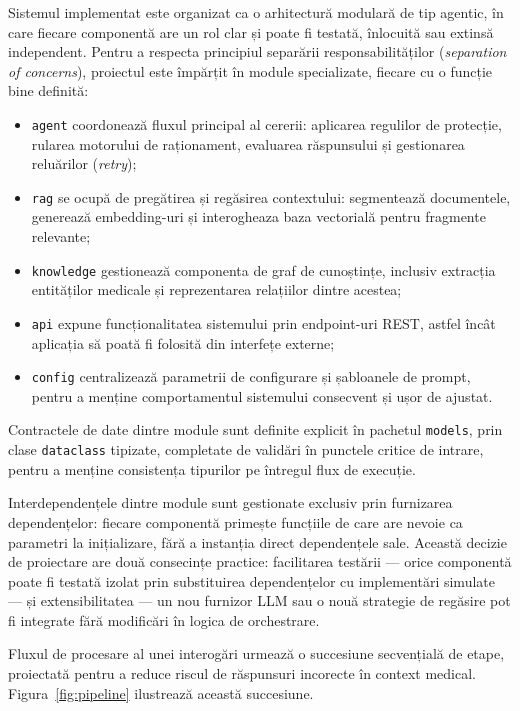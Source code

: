 \documentclass[12pt, a4paper, oneside, romanian]{teza-upb}
\begin{document}
Sistemul implementat este organizat ca o arhitectură modulară de tip agentic, în care fiecare componentă are un rol clar și poate fi testată, înlocuită sau extinsă independent. Pentru a respecta principiul separării responsabilităților (\textit{separation of concerns}), proiectul este împărțit în module specializate, fiecare cu o funcție bine definită:
\begin{itemize}
    \item \texttt{agent} coordonează fluxul principal al cererii: aplicarea regulilor de protecție, rularea motorului de raționament, evaluarea răspunsului și gestionarea reluărilor (\textit{retry});
    \item \texttt{rag} se ocupă de pregătirea și regăsirea contextului: segmentează documentele, generează embedding-uri și interogheaza baza vectorială pentru fragmente relevante;
    \item \texttt{knowledge} gestionează componenta de graf de cunoștințe, inclusiv extracția entităților medicale și reprezentarea relațiilor dintre acestea;
    \item \texttt{api} expune funcționalitatea sistemului prin endpoint-uri REST, astfel încât aplicația să poată fi folosită din interfețe externe;
    \item \texttt{config} centralizează parametrii de configurare și șabloanele de prompt, pentru a menține comportamentul sistemului consecvent și ușor de ajustat.
\end{itemize}
Contractele de date dintre module sunt definite explicit în pachetul \texttt{models}, prin clase \texttt{dataclass} tipizate, completate de validări în punctele critice de intrare, pentru a menține consistența tipurilor pe întregul flux de execuție.

Interdependențele dintre module sunt gestionate exclusiv prin furnizarea dependențelor: fiecare componentă primește funcțiile de care are nevoie ca parametri la inițializare, fără a instanția direct dependențele sale. Această decizie de proiectare are două consecințe practice: facilitarea testării — orice componentă poate fi testată izolat prin substituirea dependențelor cu implementări simulate — și extensibilitatea — un nou furnizor LLM sau o nouă strategie de regăsire pot fi integrate fără modificări în logica de orchestrare.

Fluxul de procesare al unei interogări urmează o succesiune secvențială de etape, proiectată pentru a reduce riscul de răspunsuri incorecte în context medical. Figura~\ref{fig:pipeline} ilustrează această succesiune.
\end{document}

